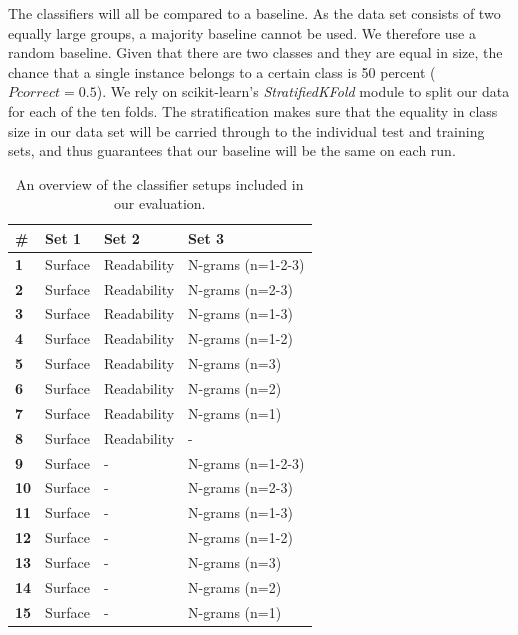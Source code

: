 \documentclass[
10pt, %
a4paper, %
oneside, %
headinclude,footinclude, %
] {book}%
\begin{document}
The classifiers will all be compared to a baseline. As the data set consists of two equally large groups, a majority baseline cannot be used. We therefore use a random baseline. Given that there are two classes and they are equal in size, the chance that a single instance belongs to a certain class is 50 percent ($Pcorrect = 0.5$). We rely on scikit-learn's \textit{StratifiedKFold} module to split our data for each of the ten folds. The stratification makes sure that the equality in class size in our data set will be carried through to the individual test and training sets, and thus guarantees that our baseline will be the same on each run.

\begin{table}[]
\caption{An overview of the classifier setups included in our evaluation.}
\centering
\begin{tabular}{llll}
\hline
\#          & \textbf{Set 1} & \textbf{Set 2} & \textbf{Set 3}    \\ \hline
\textbf{1}  & Surface        & Readability    & N-grams (n=1-2-3) \\
\textbf{2}  & Surface        & Readability    & N-grams (n=2-3)   \\
\textbf{3}  & Surface        & Readability    & N-grams (n=1-3)   \\
\textbf{4}  & Surface        & Readability    & N-grams (n=1-2)   \\
\textbf{5}  & Surface        & Readability    & N-grams (n=3)     \\
\textbf{6}  & Surface        & Readability    & N-grams (n=2)     \\
\textbf{7}  & Surface        & Readability    & N-grams (n=1)     \\
\textbf{8}  & Surface        & Readability    & -                 \\
\textbf{9}  & Surface        & -              & N-grams (n=1-2-3) \\
\textbf{10} & Surface        & -                & N-grams (n=2-3)   \\
\textbf{11} & Surface        & -              & N-grams (n=1-3)   \\
\textbf{12} & Surface        & -              & N-grams (n=1-2)   \\
\textbf{13} & Surface        & -              & N-grams (n=3)     \\
\textbf{14} & Surface        & -              & N-grams (n=2)     \\
\textbf{15} & Surface        & -              & N-grams (n=1)     \\

\end{tabular}
\end{table}
\end{document}
